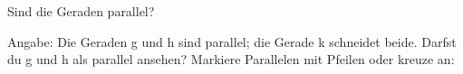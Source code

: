 \setcounter{aufgabe}{11}

\begin{aufgabe}{Sind die Geraden parallel?}
\begin{teile}
\teil Angabe: Die Geraden g und h sind parallel; die Gerade k schneidet beide. Darfst du g und h als parallel ansehen? Markiere Parallelen mit Pfeilen oder kreuze an: \\  \\ 
\end{teile}
\end{aufgabe}


